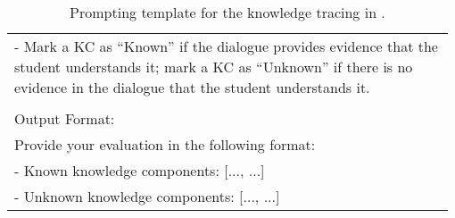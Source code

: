 \begin{table}[th]
\begin{tabular}{p{0.98\linewidth}}
\ttfamily \footnotesize - Mark a KC as ``Known'' if the dialogue provides evidence that the student understands it; mark a KC as ``Unknown'' if there is no evidence in the dialogue that the student understands it. \\
\ttfamily \footnotesize  \\
\ttfamily \footnotesize Output Format: \\
\ttfamily \footnotesize  Provide your evaluation in the following format: \\
\ttfamily \footnotesize - Known knowledge components: [..., ...] \\
\ttfamily \footnotesize - Unknown knowledge components: [..., ...]  \\
\bottomrule
\end{tabular}
\caption{Prompting template for the knowledge tracing in \model.}
\label{tab:KT_template}
\end{table}
